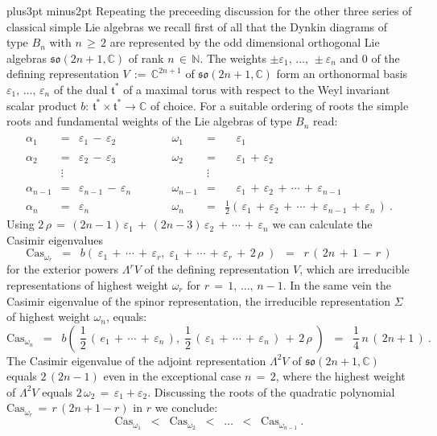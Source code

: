 \documentclass[12pt]{article}
\def\C{\mathbb{C}}
\def\Cas{\mathrm{Cas}}
\def\e{\varepsilon}
\def\L{\Lambda}
\def\N{\mathbb{N}}
\def\pfill{\vskip6pt plus3pt minus2pt\noindent}
\def\so{\mathfrak{so}}
\def\t{\mathfrak{t}}
\def\Z{\Sigma}
\begin{document}
 \pfill
 Repeating the preceeding discussion for the other three series of classical
 simple Lie algebras we recall first of all that the Dynkin diagrams of type
 $B_n$ with $n\,\geq\,2$ are represented by the odd dimensional orthogonal
 Lie algebras $\so(2n+1,\C)$ of rank $n\,\in\,\N$. The weights $\pm\e_1,\,
 \ldots,\,\pm\e_n$ and $0$ of the defining representation $V\,:=\,\C^{2n+1}$
 of $\so(2n+1,\C)$ form an orthonormal basis $\e_1,\,\ldots,\,\e_n$ of the
 dual $\t^*$ of a maximal torus with respect to the Weyl invariant scalar
 product $b:\,\t^*\times\t^*\longrightarrow\C$ of choice. For a suitable
 ordering of roots the simple roots and fundamental weights of the Lie
 algebras of type $B_n$ read:
 $$
  \begin{array}{lclclcl}
   \alpha_1&=&\e_1\,-\,\e_2&\qquad&
   \omega_1&=&\phantom{\frac12(\,}\e_1
   \\
   \alpha_2&=&\e_2\,-\,\e_3&&
   \omega_2&=&\phantom{\frac12(\,}\e_1\,+\,\e_2
   \\
   &\vdots&&&&\vdots&
   \\
   \alpha_{n-1}&=&\e_{n-1}\,-\,\e_n&&
   \omega_{n-1}&=&\phantom{\frac12(\,}\e_1\,+\,\e_2\,+\,\cdots\,+\,\e_{n-1}
   \\
   \alpha_n&=&\e_n&&
   \omega_n&=&\frac12(\,\e_1\,+\,\e_2\,+\,\cdots\,+\,\e_{n-1}\,+\,\e_n\,)\ .
  \end{array}
 $$
 Using $2\,\rho\,=\,(2n-1)\,\e_1\,+\,(2n-3)\,\e_2\,+\,\cdots\,+\,\e_n$ we
 can calculate the Casimir eigenvalues
 $$
  \Cas_{\omega_r}
  \;\;=\;\;
  b(\;\e_1\,+\,\cdots\,+\,\e_r,\;\e_1\,+\,\cdots\,+\,\e_r\,+\,2\,\rho\;)
  \;\;=\;\;
  r\,(\,2n\,+\,1\,-\,r\,)
 $$
 for the exterior powers $\L^rV$ of the defining representation $V$, which
 are irreducible representations of highest weight $\omega_r$ for $r\,=\,
 1,\,\ldots,\,n-1$. In the same vein the Casimir eigenvalue of the spinor
 representation, the irreducible representation $\Z$ of highest weight
 $\omega_n$, equals:
 $$
  \Cas_{\omega_n}
  \;\;=\;\;
  b(\;{\textstyle\frac12}\,(\,e_1\,+\,\cdots\,+\,\e_n\,),\;
  {\textstyle\frac12}\,(\,\e_1\,+\,\cdots\,+\,\e_n\,)\,+\,2\,\rho\;)
  \;\;=\;\;
  {\textstyle\frac14}\,n\,(\,2n+1\,)\ .
 $$
 The Casimir eigenvalue of the adjoint representation $\L^2V$ of $\so(2n+1,\C)$
 equals $2\,(2n-1)$ even in the exceptional case $n\,=\,2$, where the highest
 weight of $\L^2V$ equals $2\,\omega_2\,=\,\e_1+\e_2$. Discussing the roots of
 the quadratic polynomial $\Cas_{\omega_r}\,=\,r\,(2n+1-r)$ in $r$ we conclude:
 \begin{equation}\label{bnseq}
  \Cas_{\omega_1}
  \;\;<\;\;
  \Cas_{\omega_2}
  \;\;<\;\;
  \ldots
  \;\;<\;\;
  \Cas_{\omega_{n-1}}\ .
 \end{equation}
\end{document}
